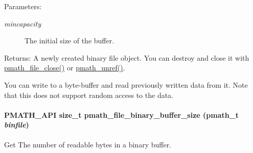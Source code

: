 \begin{Desc}
\item[Parameters:]
\begin{description}
\item[{\em mincapacity}]The initial size of the buffer. \end{description}
\end{Desc}
\begin{Desc}
\item[Returns:]A newly created binary file object. You can destroy and close it with \hyperlink{group__file__api_g61142920bd7a8f066af908092c84d8e4}{pmath\_\-file\_\-close()} or \hyperlink{classpmath__t_54e905402c38940687033b87eb8c6c9f}{pmath\_\-unref()}.\end{Desc}
You can write to a byte-buffer and read previously written data from it. Note that this does not support random access to the data. \hypertarget{group__file__api_gaa064ada946d36bf41ed9908d8176360}{
\paragraph[{pmath\_\-file\_\-binary\_\-buffer\_\-size}]{\setlength{\rightskip}{0pt plus 5cm}PMATH\_\-API size\_\-t pmath\_\-file\_\-binary\_\-buffer\_\-size ({\bf pmath\_\-t} {\em binfile})}\hfill}
\label{group__file__api_gaa064ada946d36bf41ed9908d8176360}


Get The number of readable bytes in a binary buffer. 

